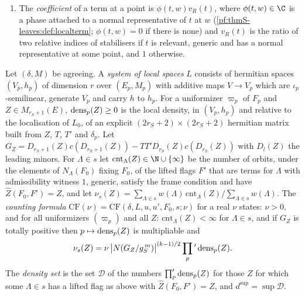 \begin{definition}
\begin{enumerate}
stabiliser of $\Lambda$ in the isometries fixing $F_0$.
\item The \emph{coefficient} of a term at a point is $\phi(t,w)v_R(t)$, where $\phi(t,w)\in\C$ is a phase attached to a
normal representative of $t$ at $w$ (\cref{pf:thmS-leaves:def:localterm}; $\phi(t,w)=0$ if there is none) and $v_R(t)$ is
the ratio of two relative indices of stabilisers if $t$ is relevant, generic and has a normal representative at some
point, and $1$ otherwise.
\end{enumerate}
\end{definition}

\begin{definition}\label{pf:thmS-leaves:def:formula}
Let $(\delta,M)$ be agreeing. A \emph{system of local spaces} $L$ consists of hermitian spaces $(V_p,h_p)$ of
dimension $r$ over $(E_p,M_p)$ with additive maps $V\to V_p$ which are $\iota_p$-semilinear, generate $V_p$ and carry
$h$ to $h_p$. For a uniformizer $\varpi_p$ of $F_p$ and $Z\in M_{r_S+1}(E)$, $\mathrm{dens}_p(Z)\ge0$ is the local
density, in $(V_p,h_p)$ and relative to the localisation of $L_0$, of an explicit $(2r_S+2)\times(2r_S+2)$ hermitian
matrix built from $Z$, $T$, $T'$ and $\delta_p$. Let $G_Z=D_{r_S+1}(Z)c(D_{r_S+1}(Z))-TT'D_{r_S}(Z)c(D_{r_S}(Z))$ with
$D_l(Z)$ the leading minors. For $\Lambda\in s$ let $\mathrm{cnt}_\Lambda(Z)\in\N\cup\{\infty\}$ be the number of orbits, under the
elements of $N_\Lambda(F_0)$ fixing $F_0$, of the lifted flags $F'$ that are terms for $\Lambda$ with admissibility witness
$1$, generic, satisfy the frame condition and have $\widehat Z(F_0,F')=Z$, and let
$\nu_s(Z)=\sum_{\Lambda\in s}w(\Lambda)\,\mathrm{cnt}_\Lambda(Z)\big/\sum_{\Lambda\in s}w(\Lambda)$. The \emph{counting formula}
$\mathrm{CF}(\nu)=\mathrm{CF}(\delta,L,u,u',F_0,s;\nu)$ for a real $\nu$ states: $\nu>0$, and for all uniformizers
$(\varpi_p)$ and all $Z$: $\mathrm{cnt}_\Lambda(Z)<\infty$ for $\Lambda\in s$, and if $G_Z$ is totally positive then
$p\mapsto\mathrm{dens}_p(Z)$ is multipliable and
\begin{equation}\label{pf:thmS-leaves:eq:formula}
\nu_s(Z)=\nu\,\bigl|N(G_Z/g_S^{\,m})\bigr|^{(k-1)/2}\prod_p{}'\,\mathrm{dens}_p(Z).
\end{equation}
The \emph{density set} is the set $\mathcal D$ of the numbers $\prod'_p\mathrm{dens}_p(Z)$ for those $Z$ for which some
$\Lambda\in s$ has a lifted flag as above with $\widehat Z(F_0,F')=Z$, and $d^{\sup}=\sup\mathcal D$.
\end{definition}

